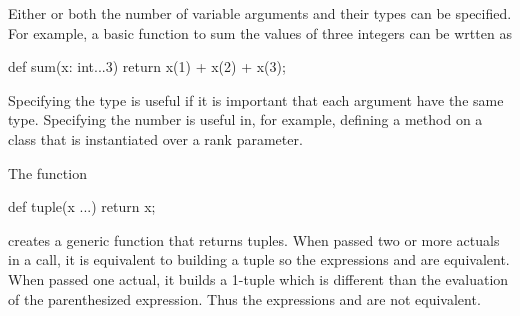\begin{example}
Either or both the number of variable arguments and their types can be
specified.  For example, a basic function to sum the values of three
integers can be wrtten as
\begin{chapel}
def sum(x: int...3) return x(1) + x(2) + x(3);
\end{chapel}
Specifying the type is useful if it is important that each argument
have the same type.  Specifying the number is useful in, for example,
defining a method on a class that is instantiated over a rank
parameter.
\end{example}

\begin{example}
The function
\begin{chapel}
def tuple(x ...) return x;
\end{chapel}
creates a generic function that returns tuples.  When passed two or
more actuals in a call, it is equivalent to building a tuple so the
expressions  and  are equivalent.  When
passed one actual, it builds a 1-tuple which is different than the
evaluation of the parenthesized expression.  Thus the
expressions  and  are not equivalent.
\end{example}
